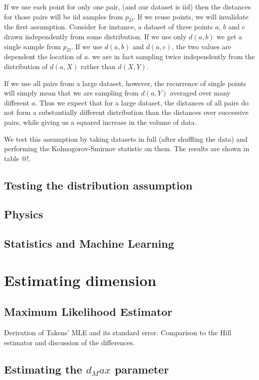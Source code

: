 \documentclass{article}
\begin{document}
If we use each point for only one pair, (and our dataset is iid) then the distances for those pairs will be iid samples from $p_D$. If we reuse points, we will invalidate the first assumption. Consider for instance, a dataset of three points $a$, $b$ and $c$ drawn independently from some distribution. If we use only $d(a, b)$ we get a single sample from $p_D$. If we use $d(a, b)$ and $d(a, c)$, the two values are dependent the location of $a$. we are in fact sampling twice independently from the distribution of $d(a, X)$ rather than $d(X, Y)$.
 
If we use all pairs from a large dataset, however, the recurrence of single points will simply mean that we are sampling from $d(a, Y)$ averaged over many different $a$. Thus we expect that for a large dataset, the distances of all pairs do not form a substantially different distribution than the distances over successive pairs, while giving us a squared increase in the volume of data.

We test this assumption by taking datasets in full (after shuffling the data) and performing the Kolmogorov-Smirnov statistic on them. The results are shown in table @!.

\subsection{Testing the distribution assumption}



\subsection{Physics}
\subsection{Statistics and Machine Learning}

\section{Estimating dimension}

\subsection{Maximum Likelihood Estimator}

Derivation of Takens' MLE and its standard error. Comparison to the Hill estimator and discussion of the differences.
 
\subsection{Estimating the $d_Max$ parameter}
\end{document}
